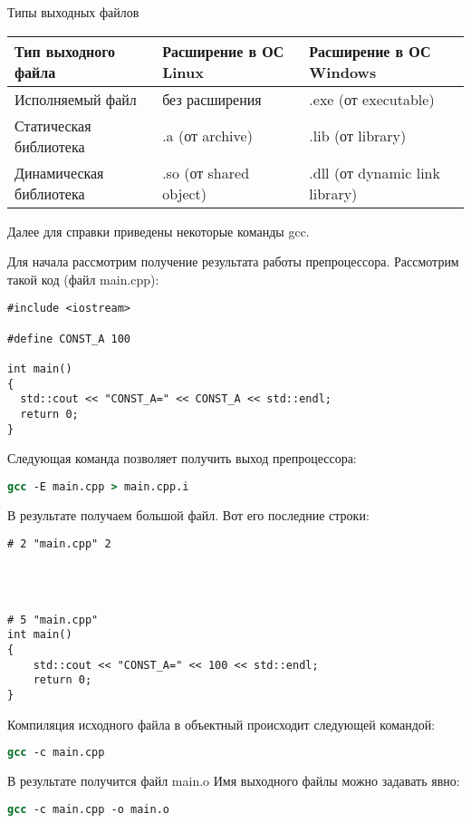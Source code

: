 Типы выходных файлов

\begin{tabular}{|l|l|l|}
	\hline
	\textbf{Тип выходного файла} & \textbf{Расширение в ОС Linux} & \textbf{Расширение в ОС Windows} \\
	\hline
	Исполняемый файл & без расширения & .exe (от executable) \\
	\hline
	Статическая библиотека & .a (от archive) & .lib (от library) \\
	\hline
	Динамическая библиотека & .so (от shared object) & .dll (от dynamic link library) \\
	\hline
\end{tabular}

\clearpage

Далее для справки приведены некоторые команды gcc.

Для начала рассмотрим получение результата работы препроцессора. Рассмотрим такой код (файл main.cpp):


\begin{lstlisting}
#include <iostream>

#define CONST_A 100

int main()
{
  std::cout << "CONST_A=" << CONST_A << std::endl;
  return 0;
}
\end{lstlisting}


Следующая команда позволяет получить выход препроцессора:

\begin{lstlisting}[language=csh]
gcc -E main.cpp > main.cpp.i
\end{lstlisting}

В результате получаем большой файл. Вот его последние строки:

\begin{lstlisting}[firstnumber=28636]
# 2 "main.cpp" 2




# 5 "main.cpp"
int main()
{
	std::cout << "CONST_A=" << 100 << std::endl;
	return 0;
}
\end{lstlisting}

Компиляция исходного файла в объектный происходит следующей командой:

\begin{lstlisting}[language=csh]
gcc -c main.cpp
\end{lstlisting}

В результате получится файл main.o Имя выходного файлы можно задавать явно:

\begin{lstlisting}[language=csh]
gcc -c main.cpp -o main.o
\end{lstlisting}


